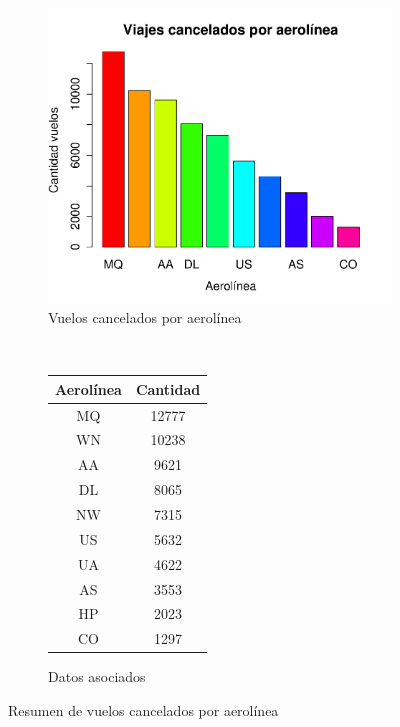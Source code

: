 \documentclass[12pt]{article}
\numberwithin{equation}{section}
\numberwithin{table}{section}
\numberwithin{figure}{section}
\begin{document}
\begin{figure}
        \centering
        ~
        \begin{subfigure}[b]{0.6\textwidth}
                \includegraphics[width=1\columnwidth]{imagenes/cancelados/viajes-cancelados-por-aerolinea}
                \caption{Vuelos cancelados por aerolínea}
        \end{subfigure}
        ~
        \begin{subfigure}[b]{0.3\textwidth}
\begin{tabular}{@{}cc@{}}
\toprule
\textbf{Aerolínea} & \textbf{Cantidad} \\ \midrule
MQ                 & 12777             \\
WN                 & 10238             \\
AA                 & 9621              \\
DL                 & 8065              \\
NW                 & 7315              \\
US                 & 5632              \\
UA                 & 4622              \\
AS                 & 3553              \\
HP                 & 2023              \\
CO                 & 1297              \\ \bottomrule
\end{tabular}
                \caption{Datos asociados}
        \end{subfigure}
        \caption{Resumen de vuelos cancelados por aerolínea}
        \label{fig:cancelados-por-aerolinea}
\end{figure}
\end{document}
